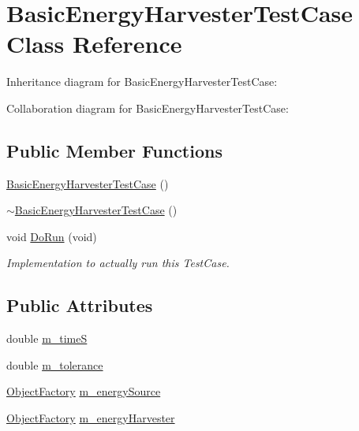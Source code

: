 \hypertarget{classBasicEnergyHarvesterTestCase}{}\section{Basic\+Energy\+Harvester\+Test\+Case Class Reference}
\label{classBasicEnergyHarvesterTestCase}


Inheritance diagram for Basic\+Energy\+Harvester\+Test\+Case\+:


Collaboration diagram for Basic\+Energy\+Harvester\+Test\+Case\+:
\subsection*{Public Member Functions}
\begin{DoxyCompactItemize}
\item 
\hyperlink{classBasicEnergyHarvesterTestCase_af46c592b02f0e0ce705f826657076c7b}{Basic\+Energy\+Harvester\+Test\+Case} ()
\item 
\hyperlink{classBasicEnergyHarvesterTestCase_a960048f7a184f7d334edf4f1cf2c8310}{$\sim$\+Basic\+Energy\+Harvester\+Test\+Case} ()
\item 
void \hyperlink{classBasicEnergyHarvesterTestCase_a0ccc441de009ad419be183aae7398576}{Do\+Run} (void)
\begin{DoxyCompactList}\small\item\em Implementation to actually run this Test\+Case. \end{DoxyCompactList}\end{DoxyCompactItemize}
\subsection*{Public Attributes}
\begin{DoxyCompactItemize}
\item 
double \hyperlink{classBasicEnergyHarvesterTestCase_a7fb984119deb87b873e2ca42744ac8d5}{m\+\_\+timeS}
\item 
double \hyperlink{classBasicEnergyHarvesterTestCase_ab99eb52f3d30d0a6bd4355bbea80a2a7}{m\+\_\+tolerance}
\item 
\hyperlink{classns3_1_1ObjectFactory}{Object\+Factory} \hyperlink{classBasicEnergyHarvesterTestCase_a584587fe08d8a8ba0efe8da4acbb69dc}{m\+\_\+energy\+Source}
\item 
\hyperlink{classns3_1_1ObjectFactory}{Object\+Factory} \hyperlink{classBasicEnergyHarvesterTestCase_a690155e18bc90086f4bc116bc522a717}{m\+\_\+energy\+Harvester}
\end{DoxyCompactItemize}
